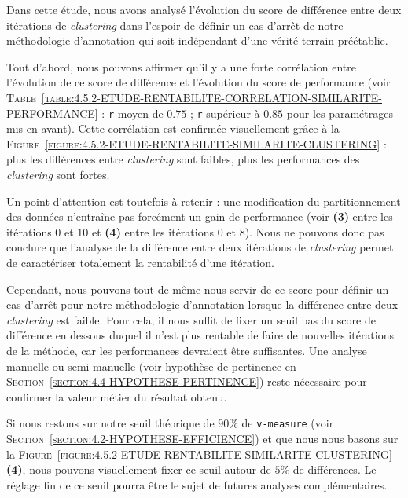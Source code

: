 			Dans cette étude, nous avons analysé l'évolution du score de différence entre deux itérations de \textit{clustering} dans l'espoir de définir un cas d'arrêt de notre méthodologie d'annotation qui soit indépendant d'une vérité terrain préétablie.
			
			Tout d'abord, nous pouvons affirmer qu'il y a une forte corrélation entre l'évolution de ce score de différence et l'évolution du score de performance (voir \textsc{Table~\ref{table:4.5.2-ETUDE-RENTABILITE-CORRELATION-SIMILARITE-PERFORMANCE}} : \texttt{r} moyen de $0.75$ ; \texttt{r} supérieur à $0.85$ pour les paramétrages mis en avant).
			Cette corrélation est confirmée visuellement grâce à la \textsc{Figure~\ref{figure:4.5.2-ETUDE-RENTABILITE-SIMILARITE-CLUSTERING}} : plus les différences entre \textit{clustering} sont faibles, plus les performances des \textit{clustering} sont fortes.
			
			Un point d'attention est toutefois à retenir : une modification du partitionnement des données n'entraîne pas forcément un gain de performance (voir \textbf{(3)} entre les itérations $0$ et $10$ et \textbf{(4)} entre les itérations $0$ et $8$).
			Nous ne pouvons donc pas conclure que l'analyse de la différence entre deux itérations de \textit{clustering} permet de caractériser totalement la rentabilité d'une itération.
			
			Cependant, nous pouvons tout de même nous servir de ce score pour définir un cas d'arrêt pour notre méthodologie d'annotation lorsque la différence entre deux \textit{clustering} est faible.
			Pour cela, il nous suffit de fixer un seuil bas du score de différence en dessous duquel il n'est plus rentable de faire de nouvelles itérations de la méthode, car les performances devraient être suffisantes.
			Une analyse manuelle ou semi-manuelle (voir hypothèse de pertinence en \textsc{Section~\ref{section:4.4-HYPOTHESE-PERTINENCE}}) reste nécessaire pour confirmer la valeur métier du résultat obtenu.
			
			\begin{leftBarIdea}
				Si nous restons sur notre seuil théorique de $90$\% de \texttt{v-measure} (voir \textsc{Section~\ref{section:4.2-HYPOTHESE-EFFICIENCE}}) et que nous nous basons sur la \textsc{Figure~\ref{figure:4.5.2-ETUDE-RENTABILITE-SIMILARITE-CLUSTERING}} \textbf{(4)}, nous pouvons visuellement fixer ce seuil autour de $5$\% de différences.
				Le réglage fin de ce seuil pourra être le sujet de futures analyses complémentaires.
			\end{leftBarIdea}
			
